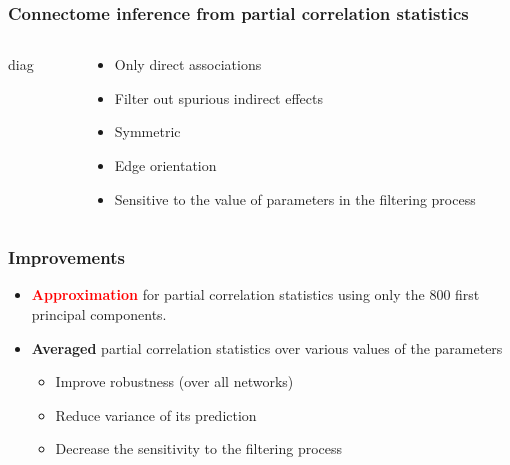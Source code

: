 \documentclass[final]{beamer}
\newcommand{\cmark}{\ding{51}}%
\newcommand{\xmark}{\ding{55}}%
\begin{document}
\begin{frame}

\frametitle{Connectome \textbf{inference} from {\color{red} partial correlation statistics}}

\begin{columns}
\begin{column}{0.5\linewidth}
diag
\end{column}
\begin{column}{0.5\linewidth}

\begin{itemize}
\item[{\color{green} \cmark}] Only direct associations
\item[{\color{green} \cmark}] Filter out spurious indirect effects
\item[{\color{green} \cmark}] Symmetric \\[5ex]
\item[{\color{red} \xmark}] Edge orientation
\item[{\color{red} \xmark}] Sensitive to the value of parameters in the filtering process
\end{itemize}

\end{column}

\end{columns}

\end{frame}


\begin{frame}
\frametitle{Improvements}

\begin{itemize}
\item \textcolor{red}{\textbf{Approximation}} for partial correlation statistics using only the \textcolor{i6blue}{800 first principal components}. \\[5ex]
\item {\color{red} \textbf{Averaged} partial correlation statistics} over various values of the parameters
	\begin{itemize}
		\item[{\color{green} \cmark}] Improve robustness (over all networks)
		\item[{\color{green} \cmark}] Reduce variance of its prediction
		\item[{\color{green} \cmark}] Decrease the sensitivity to the filtering process
	\end{itemize}
\end{itemize}

\end{frame}
\end{document}
